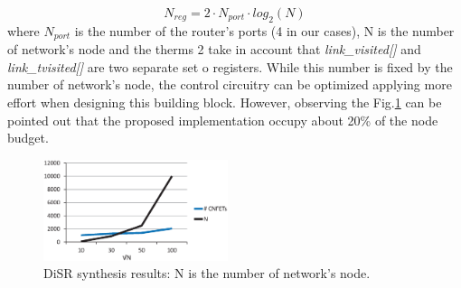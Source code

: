 \begin{equation}
  \label{eq:imp_trend}
  N_{reg}=2\cdot N_{port} \cdot log_2(N)
\end{equation}
where $N_{port}$ is the number of the router's ports (4 in our cases), N is the number 
of network's node and the therms 2 take in account that \emph{link\_visited[]} and 
\emph{link\_tvisited[]} are two separate set o registers. While this number is fixed by 
the number of network's node, the control circuitry can be optimized applying more effort 
when designing this building block. However, observing the Fig.\ref{fig:imp_trend} can 
be pointed out that the proposed implementation occupy  about 20\% of the node budget. 

\begin{figure}
  \centering
  \includegraphics[width=0.48\textwidth]{pictures/imp_rslt.eps}
  \caption{DiSR synthesis results: N is the number of network's node.}
 \label{fig:imp_trend}
\end{figure}
